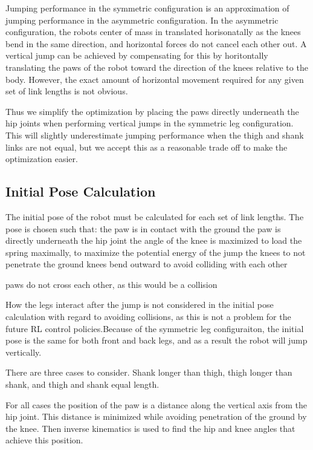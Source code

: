 Jumping performance in the symmetric configuration is an approximation of jumping performance in the asymmetric configuration. In the asymmetric configuration, the robots center of mass in translated horisonatally as the knees bend in the same direction, and horizontal forces do not cancel each other out. A vertical jump can be achieved by compensating for this by horitontally translating the paws of the robot toward the direction of the knees relative to the body. However, the exact amount of horizontal movement required for any given set of link lengths is not obvious.

Thus we simplify the optimization by placing the paws directly underneath the hip joints when performing vertical jumps in the symmetric leg configuration. This will slightly underestimate jumping performance when the thigh and shank links are not equal, but we accept this as a reasonable trade off to make the optimization easier.


\subsection{Initial Pose Calculation}
The initial pose of the robot must be calculated for each set of link lengths. The pose is chosen such that:
    the paw is in contact with the ground
     the paw is directly underneath the hip joint
     the angle of the knee is maximized to load the spring maximally, to maximize the potential energy of the jump
     the knees to not penetrate the ground
     knees bend outward to avoid colliding with each other

    
     paws do not cross each other, as this would be a collision

How the legs interact after the jump is not considered in the initial pose calculation with regard to avoiding collisions, as this is not a problem for the future RL control policies.Because of the symmetric leg configuraiton, the initial pose is the same for both front and back legs, and as a result the robot will jump vertically.
     
     
There are three cases to consider.
    Shank longer than thigh, thigh longer than shank, and thigh and shank equal length. 

For all cases the position of the paw is a distance along the vertical axis from the hip joint. This distance is minimized while avoiding penetration of the ground by the knee. Then inverse kinematics is used to find the hip and knee angles that achieve this position. 

